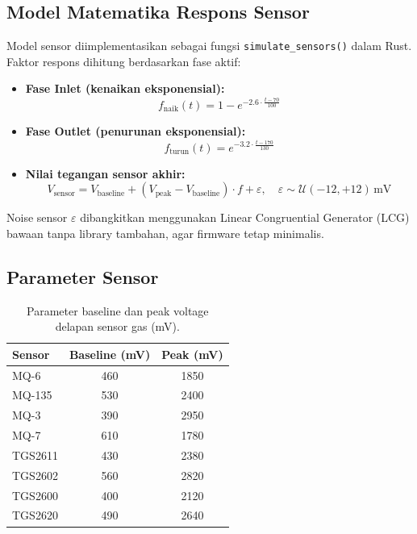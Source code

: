 \documentclass[12pt,a4paper]{report}
\begin{document}
\subsection{Model Matematika Respons Sensor}

Model sensor diimplementasikan sebagai fungsi \texttt{simulate\_sensors()} dalam
Rust. Faktor respons dihitung berdasarkan fase aktif:

\begin{itemize}[leftmargin=2cm]
  \item \textbf{Fase Inlet (kenaikan eksponensial):}
        \[
          f_{\text{naik}}(t) = 1 - e^{-2.6 \cdot \frac{t - 70}{100}}
        \]
  \item \textbf{Fase Outlet (penurunan eksponensial):}
        \[
          f_{\text{turun}}(t) = e^{-3.2 \cdot \frac{t - 170}{130}}
        \]
  \item \textbf{Nilai tegangan sensor akhir:}
        \[
          V_{\text{sensor}} = V_{\text{baseline}}
            + (V_{\text{peak}} - V_{\text{baseline}}) \cdot f
            + \varepsilon, \quad \varepsilon \sim \mathcal{U}(-12,+12)\,\text{mV}
        \]
\end{itemize}

Noise sensor $\varepsilon$ dibangkitkan menggunakan Linear Congruential Generator
(LCG) bawaan tanpa library tambahan, agar firmware tetap minimalis.

\subsection{Parameter Sensor}

\begin{table}[H]
  \centering
  \caption{Parameter baseline dan peak voltage delapan sensor gas (mV).}
  \label{tab:sensor_params}
  \begin{tabular}{lcc}
    \toprule
    \textbf{Sensor} & \textbf{Baseline (mV)} & \textbf{Peak (mV)} \\
    \midrule
    MQ-6    & 460  & 1850 \\
    MQ-135  & 530  & 2400 \\
    MQ-3    & 390  & 2950 \\
    MQ-7    & 610  & 1780 \\
    TGS2611 & 430  & 2380 \\
    TGS2602 & 560  & 2820 \\
    TGS2600 & 400  & 2120 \\
    TGS2620 & 490  & 2640 \\
    \bottomrule
  \end{tabular}
\end{table}
\end{document}
